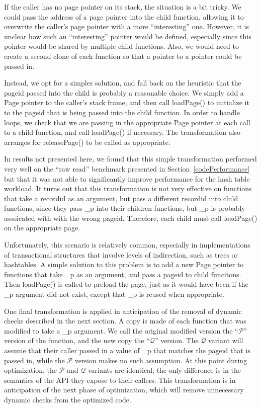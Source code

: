 \documentclass[10pt,letterpaper,twocolumn,english]{article}
\newcommand{\pin}{loadPage()\xspace}
\newcommand{\unpin}{releasePage()\xspace}
\newcommand{\PP}{\_p\xspace}
\newcommand{\fP}{{$\mathcal P$}\xspace}
\newcommand{\fQ}{{$\mathcal Q$}\xspace}
\begin{document}
If the caller has no page pointer on its stack, the situation is a bit
tricky.  We could pass the address of a page pointer into the child
function, allowing it to overwrite the caller's page pointer with a
more ``interesting'' one.  However, it is unclear how such an
``interesting'' pointer would be defined, especially since this
pointer would be shared by multiple child functions.  Also, we would need
to create a second clone of each function so that a pointer to a
pointer could be passed in.  

Instead, we opt for a simpler solution, and fall back on the heuristic
that the pageid passed into the child is probably a reasonable choice.
We simply add a Page pointer to the caller's stack frame, and then
call \pin to initialize it to the pageid that is being passed into the
child function.  In order to handle loops, we check that we are
passing in the appropriate Page pointer at each call to a child
function, and call \pin if necessary.  The
transformation also arranges for \unpin to be called as appropriate.

In results not presented here, we found that this simple
transformation performed very well on the ``raw read'' benchmark
presented in Section~\ref{codePerformance} but that it was not able to
significantly improve performance for the hash table workload.  It
turns out that this transformation is not very effective on functions
that take a recordid as an argument, but pass a different recordid
into child functions, since they pass \PP into their children
functions, but \PP is probably assoicated with with the wrong pageid.
Therefore, each child must call \pin on the appropriate page. 

Unfortunately, this scenario is relatively common, especially in
implementations of transactional structures that involve levels of
indirection, such as trees or hashtables.  A simple solution to this
problem is to add a new Page pointer to functions that take \PP as an
argument, and pass a pageid to child funcitons.  Then \pin is called
to preload the page, just as it would have been if the \PP argument
did not exist, except that \PP is reused when appropriate.

One final transformation is applied in anticipation of the removal of
dynamic checks described in the next section.  A copy is made of each
function that was modified to take a \PP argument.  We call the
original modified version the ``\fP'' version of the function, and the
new copy the ``\fQ'' version.  The \fQ variant will assume that their caller
passed in a value of \PP that matches the pageid that is passed in, while the \fP version makes no such assumption.
At this point during optimization, the \fP and \fQ variants are
identical; the only difference is in the semantics of the API they
expose to their callers.  This transformation is in anticipation of
the next phase of optimization, which will remove unnecessary dynamic
checks from the optimized code.
\end{document}
